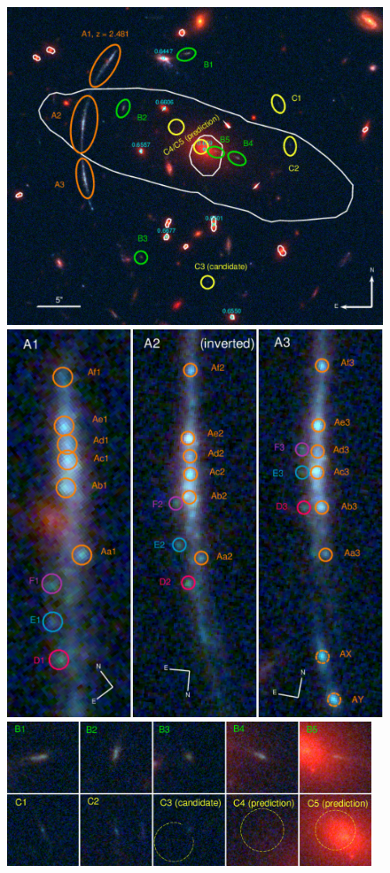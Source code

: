 \begin{figure}
\centering
\includegraphics[height=0.3\textheight]{Chap4/c4f3a.pdf}
\includegraphics[height=0.3\textheight]{Chap4/c4f3b.pdf} \\ \vspace{10pt}
\includegraphics[width=0.97\textwidth]{Chap4/c4f3c.pdf}

\end{figure}
